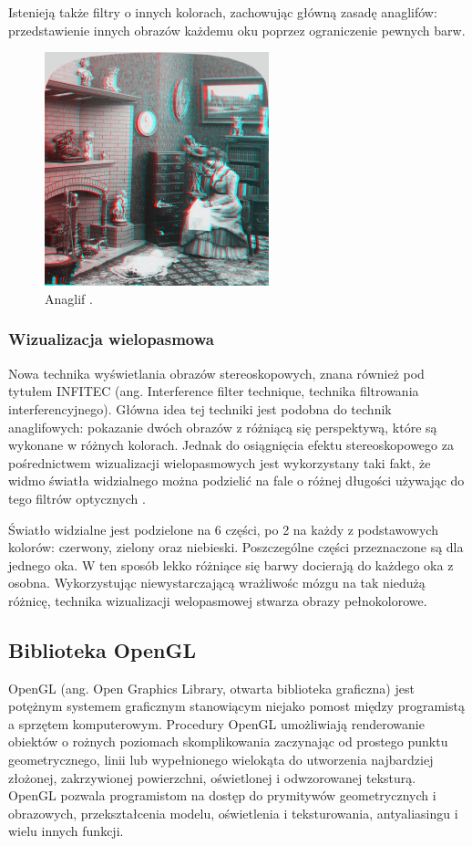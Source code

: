 Istenieją także filtry o innych kolorach, zachowując główną zasadę anaglifów: przedstawienie innych obrazów każdemu oku poprzez ograniczenie pewnych barw.

\begin{figure}[H]
		\centering
 		\includegraphics[width=6.5cm]{anaglif.jpg}
    	\caption{Anaglif \cite{anaglif}.}
 		\label{rys4}
\end{figure}

\subsubsection{Wizualizacja wielopasmowa}
Nowa technika wyświetlania obrazów stereoskopowych, znana również pod tytułem INFITEC (ang. Interference filter technique, technika filtrowania interferencyjnego). Główna idea tej techniki jest podobna do technik anaglifowych: pokazanie dwóch obrazów z różniącą się perspektywą, które są wykonane w różnych kolorach. Jednak do osiągnięcia efektu stereoskopowego za pośrednictwem wizualizacji wielopasmowych jest wykorzystany taki fakt, że widmo światła widzialnego można podzielić na fale o różnej długości używając do tego filtrów optycznych \cite{infitec}.

Światło widzialne jest podzielone na 6 części, po 2 na każdy z podstawowych kolorów: czerwony, zielony oraz niebieski. Poszczególne części przeznaczone są dla jednego oka. W ten sposób lekko różniące się barwy docierają do każdego oka z osobna. Wykorzystując niewystarczającą wrażliwośc mózgu na tak niedużą różnicę, technika wizualizacji welopasmowej stwarza obrazy pełnokolorowe.  

\newpage
\subsection{Biblioteka OpenGL}
OpenGL (ang. Open Graphics Library, otwarta biblioteka graficzna) jest potężnym systemem graficznym stanowiącym niejako pomost między programistą a sprzętem komputerowym. Procedury OpenGL umożliwiają renderowanie obiektów o rożnych poziomach skomplikowania zaczynając od prostego punktu geometrycznego, linii lub wypełnionego wielokąta do utworzenia najbardziej złożonej, zakrzywionej powierzchni, oświetlonej i odwzorowanej teksturą. OpenGL pozwala programistom na dostęp do prymitywów geometrycznych i obrazowych, przekształcenia modelu, oświetlenia i teksturowania, antyaliasingu i wielu innych funkcji. 

